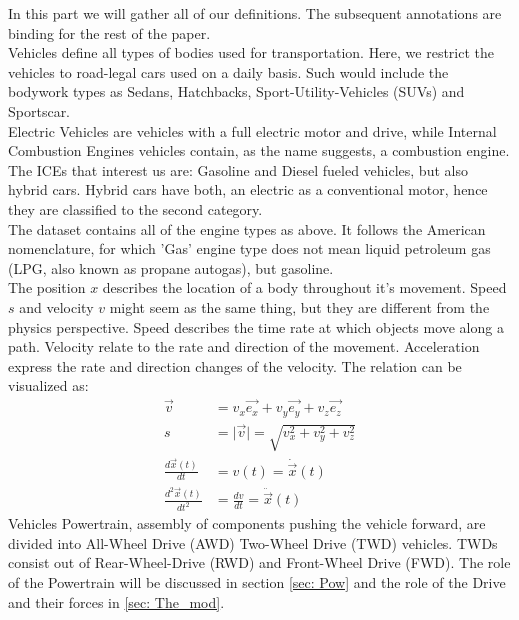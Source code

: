 In this part we will gather all of our definitions. The subsequent annotations are binding for the rest of the paper.
\\
Vehicles define all types of bodies used for transportation. Here, we restrict the vehicles to road-legal cars used on a daily basis. Such would include the bodywork types as Sedans, Hatchbacks, Sport-Utility-Vehicles (SUVs) and Sportscar.
\\
Electric Vehicles are vehicles with a full electric motor and drive, while Internal Combustion Engines vehicles contain, as the name suggests, a combustion engine. The ICEs that interest us are: Gasoline and Diesel fueled vehicles, but also hybrid cars. Hybrid cars have both, an electric as a conventional motor, hence they are classified to the second category.
\\
The dataset contains all of the engine types as above. It follows the American nomenclature, for which 'Gas' engine type does not mean liquid petroleum gas (LPG, also known as propane autogas), but gasoline.
\\ %
The position $x$ describes the location of a body throughout it's movement. Speed $s$ and velocity $v$ might seem as the same thing, but they are different from the physics perspective. Speed describes the time rate at which objects move along a path. Velocity relate to the rate and direction of the movement. Acceleration express the rate and direction changes of the velocity. The relation can be visualized as:
\begin{align*}
    \vec{v} & = v_x\vec{e_x} + v_y\vec{e_y} + v_z\vec{e_z} \\
    s & = \lvert\vec{v}\rvert = \sqrt{v_x^2 + v_y^2 + v_z^2} \\
    \frac{d\vec{x}(t)}{dt} & = v(t) = \dot{\vec{x}}(t) \\
    \frac{d^2\vec{x}(t)}{dt^2} & = \frac{dv}{dt}= \ddot{\vec{x}}(t) 
\end{align*}
Vehicles Powertrain, assembly of components pushing the vehicle forward, are divided into All-Wheel Drive (AWD) Two-Wheel Drive (TWD) vehicles. TWDs consist out of Rear-Wheel-Drive (RWD) and Front-Wheel Drive (FWD). The role of the Powertrain will be discussed in section \ref{sec: Pow} and the role of the Drive and their forces in \ref{sec: The_mod}.
